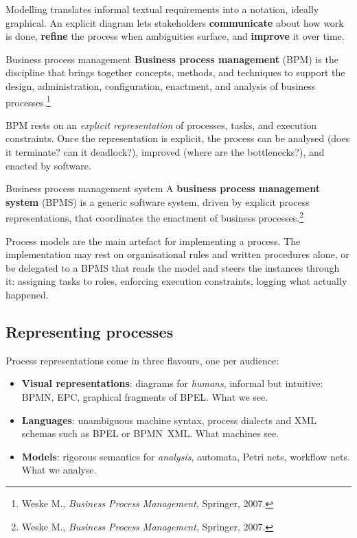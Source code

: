 Modelling translates informal textual requirements into a notation, ideally graphical. An explicit diagram lets stakeholders \textbf{communicate} about how work is done, \textbf{refine} the process when ambiguities surface, and \textbf{improve} it over time.

\begin{definitionbox}{Business process management}
\textbf{Business process management} (BPM) is the discipline that brings together concepts, methods, and techniques to support the design, administration, configuration, enactment, and analysis of business processes.\footnote{Weske M., \emph{Business Process Management}, Springer, 2007.}
\end{definitionbox}

BPM rests on an \emph{explicit representation} of processes, tasks, and execution constraints. Once the representation is explicit, the process can be analysed (does it terminate? can it deadlock?), improved (where are the bottlenecks?), and enacted by software.

\begin{definitionbox}{Business process management system}
A \textbf{business process management system} (BPMS) is a generic software system, driven by explicit process representations, that coordinates the enactment of business processes.\footnote{Weske M., \emph{Business Process Management}, Springer, 2007.}
\end{definitionbox}

Process models are the main artefact for implementing a process. The implementation may rest on organisational rules and written procedures alone, or be delegated to a BPMS that reads the model and steers the instances through it: assigning tasks to roles, enforcing execution constraints, logging what actually happened.

\subsection{Representing processes}

Process representations come in three flavours, one per audience:

\begin{itemize}
  \item \textbf{Visual representations}: diagrams for \emph{humans}, informal but intuitive: BPMN, EPC, graphical fragments of BPEL. What we see.
  \item \textbf{Languages}: unambiguous machine syntax, process dialects and XML schemas such as BPEL or BPMN~XML. What machines see.
  \item \textbf{Models}: rigorous semantics for \emph{analysis}, automata, Petri nets, workflow nets. What we analyse.
\end{itemize}

